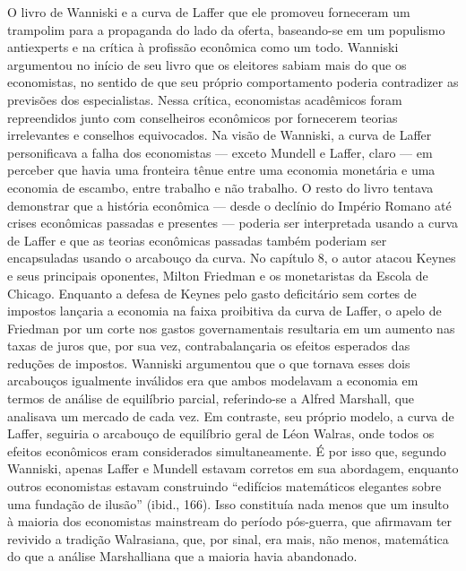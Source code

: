 \documentclass[a4paper,12pt]{article}[abntex2]
\begin{document}
O livro de Wanniski e a curva de Laffer que ele promoveu forneceram um trampolim para a propaganda do lado da oferta, baseando-se em um populismo antiexperts e na crítica à profissão econômica como um todo. Wanniski argumentou no início de seu livro que os eleitores sabiam mais do que os economistas, no sentido de que seu próprio comportamento poderia contradizer as previsões dos especialistas. Nessa crítica, economistas acadêmicos foram repreendidos junto com conselheiros econômicos por fornecerem teorias irrelevantes e conselhos equivocados. Na visão de Wanniski, a curva de Laffer personificava a falha dos economistas — exceto Mundell e Laffer, claro — em perceber que havia uma fronteira tênue entre uma economia monetária e uma economia de escambo, entre trabalho e não trabalho. O resto do livro tentava demonstrar que a história econômica — desde o declínio do Império Romano até crises econômicas passadas e presentes — poderia ser interpretada usando a curva de Laffer e que as teorias econômicas passadas também poderiam ser encapsuladas usando o arcabouço da curva. No capítulo 8, o autor atacou Keynes e seus principais oponentes, Milton Friedman e os monetaristas da Escola de Chicago. Enquanto a defesa de Keynes pelo gasto deficitário sem cortes de impostos lançaria a economia na faixa proibitiva da curva de Laffer, o apelo de Friedman por um corte nos gastos governamentais resultaria em um aumento nas taxas de juros que, por sua vez, contrabalançaria os efeitos esperados das reduções de impostos. Wanniski argumentou que o que tornava esses dois arcabouços igualmente inválidos era que ambos modelavam a economia em termos de análise de equilíbrio parcial, referindo-se a Alfred Marshall, que analisava um mercado de cada vez. Em contraste, seu próprio modelo, a curva de Laffer, seguiria o arcabouço de equilíbrio geral de Léon Walras, onde todos os efeitos econômicos eram considerados simultaneamente. É por isso que, segundo Wanniski, apenas Laffer e Mundell estavam corretos em sua abordagem, enquanto outros economistas estavam construindo ``edifícios matemáticos elegantes sobre uma fundação de ilusão'' (ibid., 166). Isso constituía nada menos que um insulto à maioria dos economistas mainstream do período pós-guerra, que afirmavam ter revivido a tradição Walrasiana, que, por sinal, era mais, não menos, matemática do que a análise Marshalliana que a maioria havia abandonado.
\end{document}
